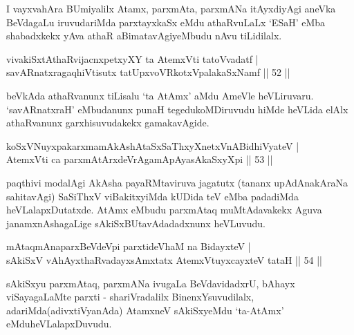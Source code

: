 \begin{artha}
I vayxvahAra BUmiyalilx Atamx, parxmAta, parxmANa itAyxdiyAgi aneVka BeVdagaLu iruvudariMda parxtayxkaSx eMdu athaRvuLaLx `ESaH' eMba shabadxkekx yAva athaR aBimatavAgiyeMbudu nAvu tiLidilalx.
\end{artha}

\begin{shl}
vivakiSxtAthaRvijacnxpetxyXY ta AtemxVti tatoV\s vadatf |\\
savARnatxragaqhiVtisutx tatUpxvoVRkotxVpalakaSxNamf \hfill || 52 ||
\end{shl}


\begin{artha}
 beVkAda athaRvanunx tiLisalu `ta AtAmx' aMdu AmeVle heVLiruvaru. `savARnatxraH' eMbudanunx punaH tegedukoMDiruvudu hiMde heVLida elAlx athaRvanunx garxhisuvudakekx gamakavAgide.
\end{artha}


\begin{shl}
koSxVNuyxpakarxmamAkAshAtaSxSaThxyXnetxVnABidhiVyateV |\\
AtemxVti ca parxmAtArxdeVrAgamApAyasAkaSxyXpi \hfill || 53 ||
\end{shl}

\begin{artha}
paqthivi modalAgi AkAsha payaRMtaviruva jagatutx (tananx upAdAnakAraNa sahitavAgi) SaSiThxV viBakitxyiMda kUDida teV eMba padadiMda heVLalapxDutatxde. AtAmx eMbudu parxmAtaq muMtAdavakekx Aguva janamxnAshagaLige sAkiSxBUtavAdadadxnunx heVLuvudu.
\end{artha}


\begin{shl}
mAtaqmAnaparxBeVdeV\s pi parxtideVhaM na BidayxteV |\\
sAkiSxV vAhAyxthaRvadayxsAmxtatx AtemxVtuyxcayxteV tataH \hfill || 54 ||
\end{shl}

\begin{artha}
sAkiSxyu parxmAtaq, parxmANa ivugaLa BeVdavidadxrU, bAhayx viSayagaLaMte parxti - shariVradalilx BinenxYsuvudilalx, adariMda\break (adivxtiVyanAda) AtamxneV sAkiSxyeMdu `ta-AtAmx' eMdu\break heVLalapxDuvudu.
\end{artha}

